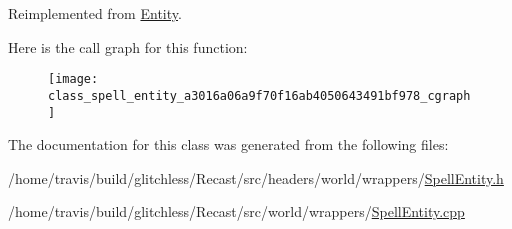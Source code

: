 Reimplemented from \hyperlink{class_entity_a704a454408456c2e0a641d0f3b66ec75}{Entity}.



Here is the call graph for this function\-:
\nopagebreak
\begin{figure}[H]
\begin{center}
\leavevmode
\texttt{[image: class\_spell\_entity\_a3016a06a9f70f16ab4050643491bf978\_cgraph]}
\end{center}
\end{figure}




The documentation for this class was generated from the following files\-:\begin{DoxyCompactItemize}
\item 
/home/travis/build/glitchless/\-Recast/src/headers/world/wrappers/\hyperlink{_spell_entity_8h}{Spell\-Entity.\-h}\item 
/home/travis/build/glitchless/\-Recast/src/world/wrappers/\hyperlink{_spell_entity_8cpp}{Spell\-Entity.\-cpp}\end{DoxyCompactItemize}
